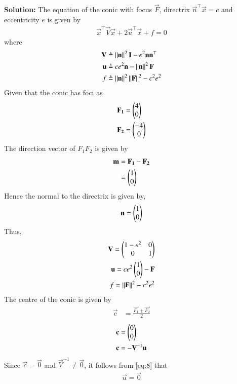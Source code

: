\documentclass[journal,12pt,twocolumn]{IEEEtran}
\begin{document}
\begin{enumerate}
\textbf{Solution:}
The equation of the conic with focus $\vec{F}$, directrix $\vec{n}^\top\vec{x} = c$ and eccentricity $e$ is given by
\begin{align}
\vec{x}^\top\vec{V}\vec{x} + 2\vec{u}^\top\vec{x} + f = 0
\label{eq:1}
\end{align}
where
\begin{align}
\mathbf{V} &\triangleq \left\lVert\mathbf{n}\right\rVert^2\mathbf{I} - e^2\mathbf{n}\mathbf{n}^\top \label{eq:2} \\
\mathbf{u} &\triangleq ce^2\mathbf{n} - \left\lVert\mathbf{n}\right\rVert^2\mathbf{F} \label{eq:3} \\
f &\triangleq \left\lVert\mathbf{n}\right\rVert^2\left\lVert\mathbf{F}\right\rVert^2 - c^2e^2 \label{eq:4}
\end{align}
Given that the conic has foci as
\begin{align}
\mathbf{F_1} &= \begin{pmatrix}4\\0\end{pmatrix}\\
\mathbf{F_2} &= \begin{pmatrix}-4\\0\end{pmatrix}
\end{align}
The direction vector of $F_1F_2$ is given by
\begin{align}
\mathbf{m} &= \mathbf{F_1} - \mathbf{F_2}\\
&= \begin{pmatrix}1\\0\end{pmatrix}
\end{align}
Hence the normal to the directrix is given by,
\begin{align}
\mathbf{n} = \begin{pmatrix}1\\0\end{pmatrix}
\end{align}
Thus,
\begin{align}
\mathbf{V} = \begin{pmatrix}1-e^2&0\\0&1\end{pmatrix} \label{eq:5} \\
\mathbf{u} = ce^2\begin{pmatrix}1\\0\end{pmatrix} - \mathbf{F} \label{eq:6} \\
f = \left\lVert\mathbf{F}\right\rVert^2 - c^2e^2 \label{eq:7}
\end{align}
The centre of the conic is given by
\begin{align}
\vec{c} &= \frac{\vec{F_1} + \vec{F_2}}{2}
\end{align}
\begin{align}
\mathbf{c} &= \begin{pmatrix}0\\0\end{pmatrix}\\
\mathbf{c} &= -\mathbf{V}^{-1}\mathbf{u}
\label{eq:8}
\end{align}
Since $\vec{c} = \vec{0}$ and $\vec{V}^{-1} \neq \vec{0}$, it follows from \eqref{eq:8} that 
\begin{align}
\vec{u} = \vec{0}
\end{align}

\end{enumerate}
\end{document}
